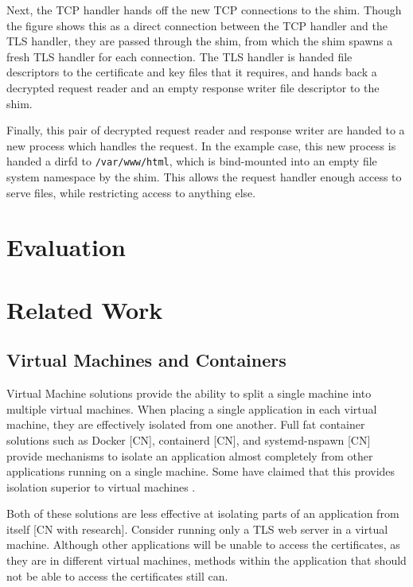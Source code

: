 \documentclass[sigplan]{acmart}
\begin{document}
Next, the TCP handler hands off the new TCP connections to the shim. Though the figure shows this as a direct connection between the TCP handler and the TLS handler, they are passed through the shim, from which the shim spawns a fresh TLS handler for each connection. The TLS handler is handed file descriptors to the certificate and key files that it requires, and hands back a decrypted request reader and an empty response writer file descriptor to the shim.

Finally, this pair of decrypted request reader and response writer are handed to a new process which handles the request. In the example case, this new process is handed a dirfd to \texttt{/var/www/html}, which is bind-mounted into an empty file system namespace by the shim. This allows the request handler enough access to serve files, while restricting access to anything else.

\section{Evaluation}


\section{Related Work}

\subsection{Virtual Machines and Containers}

Virtual Machine solutions \citep{barham_xen_2003,vmware_inc_understanding_2008} provide the ability to split a single machine into multiple virtual machines. When placing a single application in each virtual machine, they are effectively isolated from one another. Full fat container solutions such as Docker [CN], containerd [CN], and systemd-nspawn [CN] provide mechanisms to isolate an application almost completely from other applications running on a single machine. Some have claimed that this provides isolation superior to virtual machines \citep{soltesz_container-based_2007}.

Both of these solutions are less effective at isolating parts of an application from itself [CN with research]. Consider running only a TLS web server in a virtual machine. Although other applications will be unable to access the certificates, as they are in different virtual machines, methods within the application that should not be able to access the certificates still can.
\end{document}
